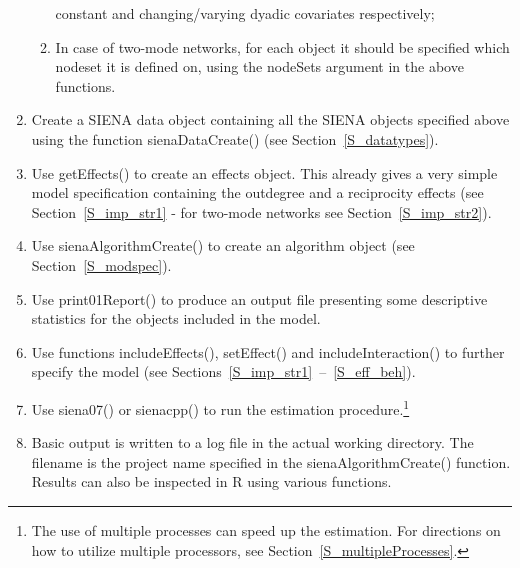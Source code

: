 \documentclass[a4paper,fleqn,11pt]{article}
\newcommand{\+}{\, + \,}
\newcommand{\sfn}[1]{\textsf{#1}}
\newcommand{\R}{{\sf R }}
\newcommand{\SI}{{\sf SIENA }}
\begin{document}
\begin{enumerate}
\begin{enumerate}
                constant and changing/varying dyadic covariates respectively;
		\item	In case of two-mode networks, for each object it should
                be specified which nodeset it is defined on, using the
                \sfn{nodeSets} argument in the above functions.
	\end{enumerate}
	\item	Create a \SI data object containing all the \SI objects
            specified above using the function \sfn{sienaDataCreate()}
            (see Section~\ref{S_datatypes}).
	\item	Use \sfn{getEffects()} to create an effects object.
            This already gives a very simple model specification
            containing the outdegree and a reciprocity effects
            (see Section~\ref{S_imp_str1} - for two-mode networks see
            Section~\ref{S_imp_str2}).
	\item	Use \sfn{sienaAlgorithmCreate()} to create an algorithm object
                (see Section~\ref{S_modspec}).
	\item	Use \sfn{print01Report()} to produce an output file
                 presenting some descriptive statistics
                for the objects included in the model.
	\item	Use functions \sfn{includeEffects()}, \sfn{setEffect()} and
            \sfn{includeInteraction()} to further specify the model
            (see Sections~\ref{S_imp_str1}~--~\ref{S_eff_beh}).
	\item	Use \sfn{siena07()} or \sfn{sienacpp()}
            to run the estimation procedure.\footnote{The
            use of multiple processes can speed up the estimation.
            For directions on how to utilize multiple processors,
            see Section~\ref{S_multipleProcesses}.}
	\item	Basic output is written to a log file in the actual working directory.
             The filename is the project name specified in the
             \sfn{sienaAlgorithmCreate()} function. Results can also be
             inspected in \R using various functions.
\end{enumerate}
\end{document}
